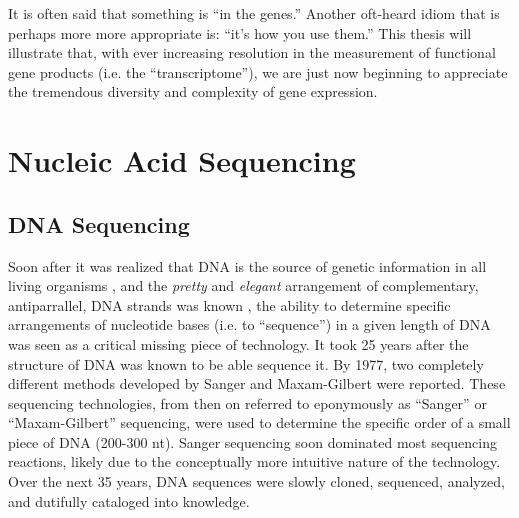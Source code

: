   It is often said that something is ``in the genes.'' Another oft-heard idiom that is perhaps more more appropriate is: ``it's how you use them.'' This thesis will illustrate that, with ever increasing resolution in the measurement of functional gene products (i.e. the ``transcriptome''), we are just now beginning to appreciate the tremendous diversity and complexity of gene expression.

\section{Nucleic Acid Sequencing}
  \label{Intro:sec:Nucleic Acid Sequencing}

  \subsection{DNA Sequencing}
    \label{Intro:subsec:DNA Sequencing History}

    Soon after it was realized that DNA is the source of genetic information in all living organisms \citep{Watson1953a}, and the \textit{pretty} and \textit{elegant} arrangement of complementary, antiparrallel, DNA strands was known \citep{Watson2012a}, the ability to determine specific arrangements of nucleotide bases (i.e. to ``sequence'') in a given length of DNA was seen as a critical missing piece of technology. It took 25 years after the structure of DNA was known to be able sequence it. By 1977, two completely different methods developed by Sanger \citep{Sanger1975a,Sanger1977b} and Maxam-Gilbert \citep{Maxam1977a} were reported. These sequencing technologies, from then on referred to eponymously as ``Sanger'' or ``Maxam-Gilbert'' sequencing, were used to determine the specific order of a small piece of DNA (200-300 nt). Sanger sequencing soon dominated most sequencing reactions, likely due to the conceptually more intuitive nature of the technology. Over the next 35 years, DNA sequences were slowly cloned, sequenced, analyzed, and dutifully cataloged into knowledge.

